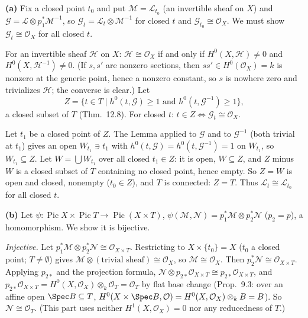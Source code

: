 \documentclass[11pt]{article}
\begin{document}
\textbf{(a)} Fix a closed point $t_0$ and put $\mathcal M=\mathcal L_{t_0}$ (an invertible sheaf on $X$) and $\mathcal G=\mathcal L\otimes p_1^*\mathcal M^{-1}$, so $\mathcal G_t=\mathcal L_t\otimes\mathcal M^{-1}$ for closed $t$ and $\mathcal G_{t_0}\cong\mathcal O_X$. We must show $\mathcal G_t\cong\mathcal O_X$ for all closed $t$.

For an invertible sheaf $\mathcal H$ on $X$: $\mathcal H\cong\mathcal O_X$ if and only if $H^0(X,\mathcal H)\ne0$ and $H^0(X,\mathcal H^{-1})\ne0$. (If $s,s'$ are nonzero sections, then $ss'\in H^0(\mathcal O_X)=k$ is nonzero at the generic point, hence a nonzero constant, so $s$ is nowhere zero and trivializes $\mathcal H$; the converse is clear.) Let
\[
Z=\{t\in T\mid h^0(t,\mathcal G)\ge1\text{ and }h^0(t,\mathcal G^{-1})\ge1\},
\]
a closed subset of $T$ (Thm.~12.8). For closed $t$: $t\in Z\iff\mathcal G_t\cong\mathcal O_X$.

Let $t_1$ be a closed point of $Z$. The Lemma applied to $\mathcal G$ and to $\mathcal G^{-1}$ (both trivial at $t_1$) gives an open $W_{t_1}\ni t_1$ with $h^0(t,\mathcal G)=h^0(t,\mathcal G^{-1})=1$ on $W_{t_1}$, so $W_{t_1}\subseteq Z$. Let $W=\bigcup W_{t_1}$ over all closed $t_1\in Z$: it is open, $W\subseteq Z$, and $Z$ minus $W$ is a closed subset of $T$ containing no closed point, hence empty. So $Z=W$ is open and closed, nonempty ($t_0\in Z$), and $T$ is connected: $Z=T$. Thus $\mathcal L_t\cong\mathcal L_{t_0}$ for all closed $t$.

\textbf{(b)} Let $\psi\colon\operatorname{Pic}X\times\operatorname{Pic}T\to\operatorname{Pic}(X\times T)$, $\psi(\mathcal M,\mathcal N)=p_1^*\mathcal M\otimes p_2^*\mathcal N$ ($p_2=p$), a homomorphism. We show it is bijective.

\emph{Injective.} Let $p_1^*\mathcal M\otimes p_2^*\mathcal N\cong\mathcal O_{X\times T}$. Restricting to $X\times\{t_0\}=X$ ($t_0$ a closed point; $T\neq\emptyset$) gives $\mathcal M\otimes(\text{trivial sheaf})\cong\mathcal O_X$, so $\mathcal M\cong\mathcal O_X$. Then $p_2^*\mathcal N\cong\mathcal O_{X\times T}$. Applying $p_{2*}$ and the projection formula, $\mathcal N\otimes p_{2*}\mathcal O_{X\times T}\cong p_{2*}\mathcal O_{X\times T}$, and $p_{2*}\mathcal O_{X\times T}=H^0(X,\mathcal O_X)\otimes_k\mathcal O_T=\mathcal O_T$ by flat base change (Prop.~9.3: over an affine open $\Spec B\subseteq T$, $H^0(X\times\Spec B,\mathcal O)=H^0(X,\mathcal O_X)\otimes_kB=B$). So $\mathcal N\cong\mathcal O_T$. (This part uses neither $H^1(X,\mathcal O_X)=0$ nor any reducedness of $T$.)
\end{document}
